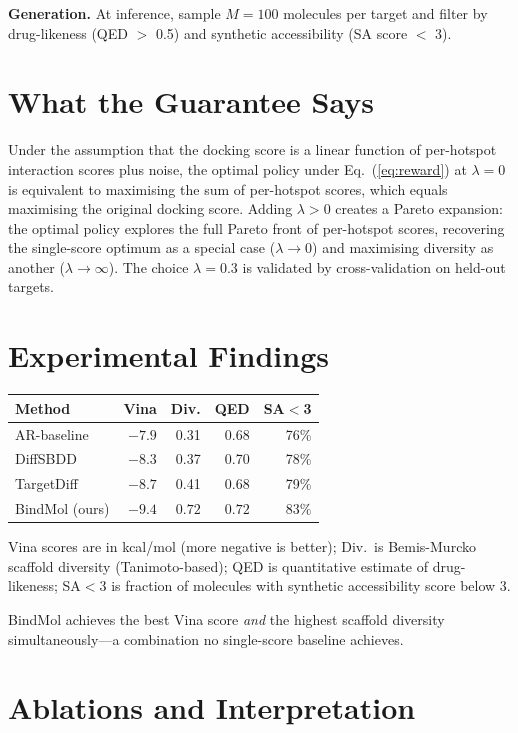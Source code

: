 \documentclass[10pt,twocolumn]{article}
\begin{document}
\textbf{Generation.}
At inference, sample $M=100$ molecules per target and filter by drug-likeness (QED $>$ 0.5) and synthetic accessibility (SA score $<$ 3).

\section{What the Guarantee Says}

Under the assumption that the docking score is a linear function of per-hotspot interaction scores plus noise, the optimal policy under Eq.~(\ref{eq:reward}) at $\lambda=0$ is equivalent to maximising the sum of per-hotspot scores, which equals maximising the original docking score.
Adding $\lambda > 0$ creates a Pareto expansion: the optimal policy explores the full Pareto front of per-hotspot scores, recovering the single-score optimum as a special case ($\lambda \to 0$) and maximising diversity as another ($\lambda \to \infty$).
The choice $\lambda = 0.3$ is validated by cross-validation on held-out targets.

\section{Experimental Findings}

\begin{center}
\small
\begin{tabular}{lrrrr}
\toprule
\textbf{Method} & \textbf{Vina} & \textbf{Div.} & \textbf{QED} & \textbf{SA$<$3} \\
\midrule
AR-baseline & $-7.9$ & 0.31 & 0.68 & 76\% \\
DiffSBDD & $-8.3$ & 0.37 & 0.70 & 78\% \\
TargetDiff & $-8.7$ & 0.41 & 0.68 & 79\% \\
BindMol (ours) & $\mathbf{-9.4}$ & $\mathbf{0.72}$ & $0.72$ & $83\%$ \\
\bottomrule
\end{tabular}
\end{center}

Vina scores are in kcal/mol (more negative is better); Div.\ is Bemis-Murcko scaffold diversity (Tanimoto-based); QED is quantitative estimate of drug-likeness; SA$<$3 is fraction of molecules with synthetic accessibility score below 3.

BindMol achieves the best Vina score \emph{and} the highest scaffold diversity simultaneously---a combination no single-score baseline achieves.

\section{Ablations and Interpretation}
\end{document}
